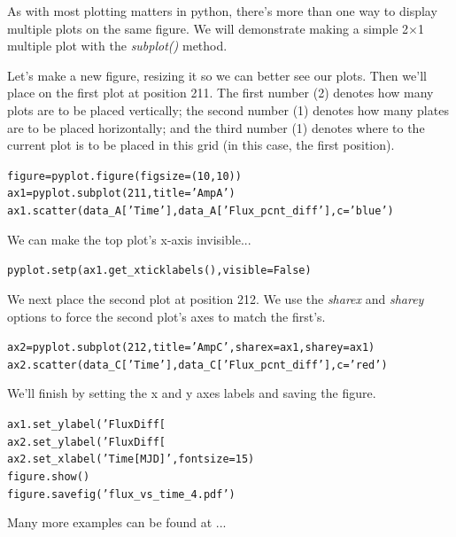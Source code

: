 As with most plotting matters in python, there's more than one way to 
display multiple plots on the same figure. We will demonstrate making
a simple 2$\times$1 multiple plot with the \textit{subplot()} method. 

Let's make a new figure, resizing it so we can better see our plots.
Then we'll place on the first plot at position 211. The first number (2) denotes 
how many plots are to be placed vertically; the second number (1) denotes
how many plates are to be placed horizontally; and the third number (1) denotes
where to the current plot is to be placed in this grid (in this case, the first position). 

\begin{alltt}
\pytab figure = pyplot.figure(figsize = (10,10))
\pytab ax1 = pyplot.subplot(211, title='Amp A')
\pytab ax1.scatter(data_A['Time'], data_A['Flux_pcnt_diff'], c='blue')
\end{alltt}

We can make the top plot's x-axis invisible... 

\begin{alltt}
\pytab pyplot.setp(ax1.get_xticklabels(), visible=False)
\end{alltt}

We next place the second plot at position 212. We use the \textit{sharex} and \textit{sharey} options
to force the second plot's  axes to match the first's.

\begin{alltt}
\pytab ax2 = pyplot.subplot(212, title='Amp C', sharex=ax1, sharey=ax1)
\pytab ax2.scatter(data_C['Time'], data_C['Flux_pcnt_diff'], c='red')
\end{alltt}

We'll finish by setting the x and y axes labels and saving the figure.

\begin{alltt}
\pytab ax1.set_ylabel('Flux Diff [%
\pytab ax2.set_ylabel('Flux Diff [%
\pytab ax2.set_xlabel('Time [MJD]', fontsize=15)
\pytab figure.show()
\pytab figure.savefig('flux_vs_time_4.pdf')
\end{alltt}

Many more examples can be found at ...

